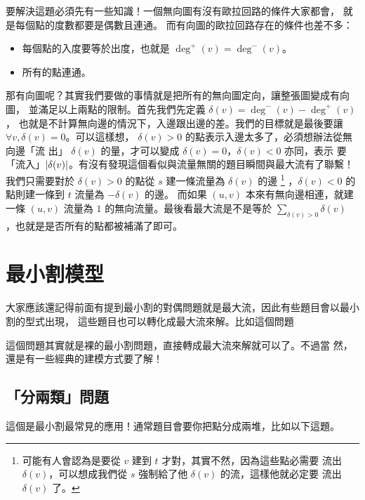 \documentclass[a4paper,12pt]{book}
\begin{document}
要解決這題必須先有一些知識！一個無向圖有沒有歐拉回路的條件大家都會，
就是每個點的度數都要是偶數且連通。 而有向圖的歐拉回路存在的條件也差不多：
\begin{itemize}
  \item 每個點的入度要等於出度，也就是 $\deg^+(v) = \deg^-(v)$。
  \item 所有的點連通。
\end{itemize}
那有向圖呢？其實我們要做的事情就是把所有的無向圖定向，讓整張圖變成有向圖，
並滿足以上兩點的限制。首先我們先定義 $\delta(v) = \deg^-(v) - \deg^+(v)$，
也就是不計算無向邊的情況下，入邊跟出邊的差。我們的目標就是最後要讓 $\forall v, \delta(v) = 0
$。可以這樣想， $\delta(v) > 0$ 的點表示入邊太多了，必須想辦法從無向邊「流
出」 $\delta(v)$ 的量，才可以變成 $\delta(v) = 0$，$\delta(v) < 0$ 亦同，表示
要「流入」$\lvert \delta(v) \rvert$。有沒有發現這個看似與流量無關的題目瞬間與最大流有了聯繫！
我們只需要對於 $\delta(v) > 0$ 的點從 $s$ 建一條流量為 $\delta(v)$ 的邊
\footnote{可能有人會認為是要從 $v$ 建到 $t$ 才對，其實不然，因為這些點必需要
  流出 $\delta(v)$，可以想成我們從 $s$ 強制給了他 $\delta(v)$ 的流，這樣他就必定要
  流出 $\delta(v)$ 了。}
，$\delta(v) < 0$ 的點則建一條到 $t$ 流量為 $-\delta(v)$ 的邊。
而如果 $(u, v)$ 本來有無向邊相連，就建
一條 $(u, v)$ 流量為 $1$ 的無向流量。最後看最大流是不是等於 $\sum_{\delta(v) > 0} \delta(v)$ 
，也就是是否所有的點都被補滿了即可。

\section{最小割模型}
大家應該還記得前面有提到最小割的對偶問題就是最大流，因此有些題目會以最小割的型式出現，
這些題目也可以轉化成最大流來解。比如這個問題


這個問題其實就是裸的最小割問題，直接轉成最大流來解就可以了。不過當
然，還是有一些經典的建模方式要了解！

\subsection{「分兩類」問題}
這個是最小割最常見的應用！通常題目會要你把點分成兩堆，比如以下這題。
\end{document}
